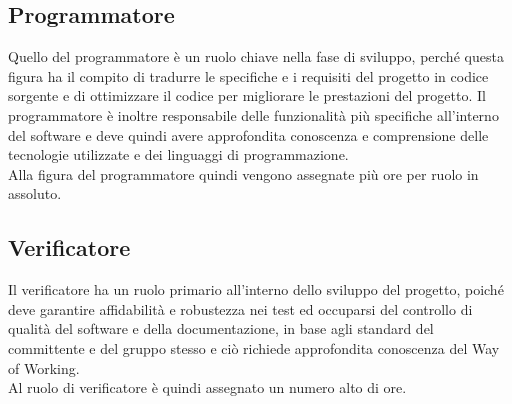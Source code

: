\subsection{Programmatore}
Quello del programmatore è un ruolo chiave nella fase di sviluppo, perché questa figura ha il compito di tradurre le specifiche e i requisiti del progetto in codice sorgente e di ottimizzare il codice per migliorare le prestazioni del progetto. Il programmatore è inoltre responsabile delle funzionalità più specifiche all'interno del software e deve quindi avere approfondita conoscenza e comprensione delle tecnologie utilizzate e dei linguaggi di programmazione.
\\
Alla figura del programmatore quindi vengono assegnate più ore per ruolo in assoluto. 

\subsection{Verificatore}
Il verificatore ha un ruolo primario all'interno dello sviluppo del progetto, poiché deve garantire affidabilità e robustezza nei test ed occuparsi del controllo di qualità del software e della documentazione, in base agli standard del committente e del gruppo stesso e ciò richiede approfondita conoscenza del Way of Working. 
\\
Al ruolo di verificatore è quindi assegnato un numero alto di ore.